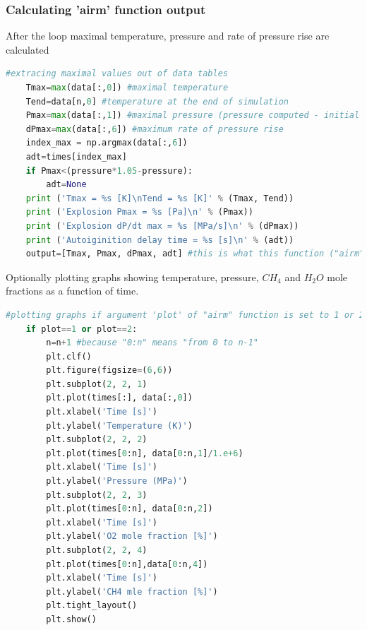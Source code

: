 \documentclass[a4paper]{article}
\begin{document}
\subsubsection{Calculating 'airm' function output}
After the loop maximal temperature, pressure and rate of pressure rise are calculated
\begin{lstlisting}[language=python]               
    #extracing maximal values out of data tables
    Tmax=max(data[:,0]) #maximal temperature
    Tend=data[n,0] #temperature at the end of simulation
    Pmax=max(data[:,1]) #maximal pressure (pressure computed - initial pressure)
    dPmax=max(data[:,6]) #maximum rate of pressure rise 
    index_max = np.argmax(data[:,6])
    adt=times[index_max]
    if Pmax<(pressure*1.05-pressure):
        adt=None
    print ('Tmax = %s [K]\nTend = %s [K]' % (Tmax, Tend))
    print ('Explosion Pmax = %s [Pa]\n' % (Pmax))
    print ('Explosion dP/dt max = %s [MPa/s]\n' % (dPmax))
    print ('Autoiginition delay time = %s [s]\n' % (adt))
    output=[Tmax, Pmax, dPmax, adt] #this is what this function ("airm") returns at the end   
\end{lstlisting}
    
Optionally plotting graphs showing temperature, pressure, $CH_4$ and $H_2O$ mole fractions as a function of time.
\begin{lstlisting}[language=python]
    #plotting graphs if argument 'plot' of "airm" function is set to 1 or 2
    if plot==1 or plot==2:
        n=n+1 #because "0:n" means "from 0 to n-1"
        plt.clf()
        plt.figure(figsize=(6,6))
        plt.subplot(2, 2, 1)
        plt.plot(times[:], data[:,0])
        plt.xlabel('Time [s]')
        plt.ylabel('Temperature (K)')
        plt.subplot(2, 2, 2)
        plt.plot(times[0:n], data[0:n,1]/1.e+6)
        plt.xlabel('Time [s]')
        plt.ylabel('Pressure (MPa)')
        plt.subplot(2, 2, 3)
        plt.plot(times[0:n], data[0:n,2])
        plt.xlabel('Time [s]')
        plt.ylabel('O2 mole fraction [%]')
        plt.subplot(2, 2, 4)
        plt.plot(times[0:n],data[0:n,4])
        plt.xlabel('Time [s]')
        plt.ylabel('CH4 mle fraction [%]')
        plt.tight_layout()
        plt.show()
\end{lstlisting}
\end{document}
